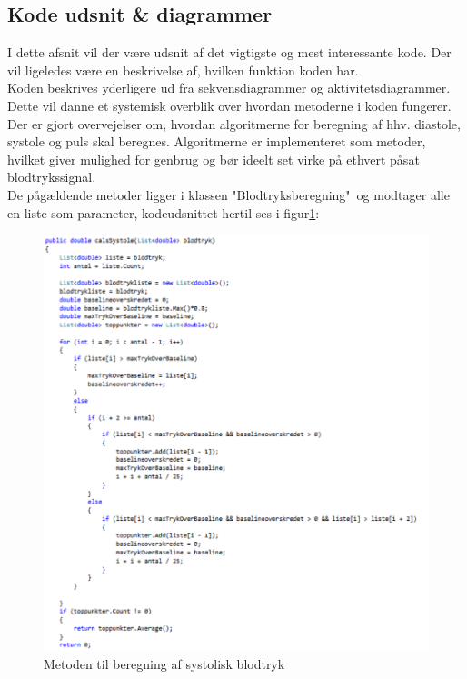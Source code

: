 \subsection{Kode udsnit \& diagrammer}
I dette afsnit vil der være udsnit af det vigtigste og mest interessante kode. Der vil ligeledes være en beskrivelse af, hvilken funktion koden har.\\
Koden beskrives yderligere ud fra sekvensdiagrammer og aktivitetsdiagrammer. Dette vil danne et systemisk overblik over hvordan metoderne i koden fungerer.\\
Der er gjort overvejelser om, hvordan algoritmerne for beregning af hhv. diastole, systole og puls skal beregnes. Algoritmerne er implementeret som metoder, hvilket giver mulighed for genbrug og bør ideelt set virke på ethvert påsat blodtrykssignal. \\
De pågældende metoder ligger i klassen "Blodtryksberegning"\ og modtager alle en liste som parameter, kodeudsnittet hertil ses i figur\ref{kode1}:

\begin{figure}[H]
	\includegraphics[width=1.3\textwidth]{Figurer/Jeppe/1}
	\caption{Metoden til beregning af systolisk blodtryk}
	\label{kode1}
\end{figure}

